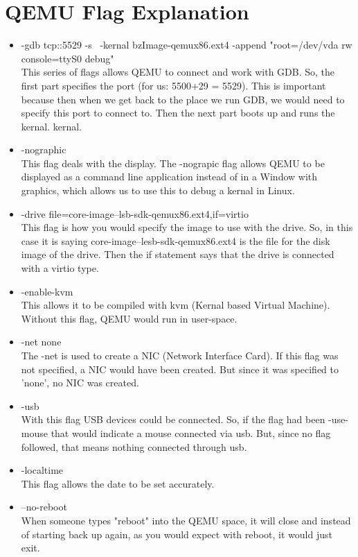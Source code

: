 \documentclass[10pt, onecolumn, letterpaper, draftclsnofoot]{IEEEtran}
\begin{document}
\section{QEMU Flag Explanation}
\begin{itemize}
\item{-gdb tcp::5529 -s \ -kernal bzImage-qemux86.ext4 \--append "root=/dev/vda rw console=ttyS0 debug"} \\
This series of flags allows QEMU to connect and work with GDB. So, the first part 
specifies the port (for us: 5500+29 = 5529). This is important because then when we
get back to the place we run GDB, we would need to specify this port to connect to. 
Then the next part boots up and runs the kernal.
kernal. 
\item{-nographic} \\
This flag deals with the display. The -nograpic flag allows QEMU to be displayed as
a command line application instead of in a Window with graphics, which allows us to 
use this to debug a kernal in Linux. 
\item{-drive file=core-image--lsb-sdk-qemux86.ext4,if=virtio} \\
This flag is how you would specify the image to use with the drive. So, in this case
it is saying core-image--lesb-sdk-qemux86.ext4 is the file for the disk image of the 
drive. Then the if statement says that the drive is connected with a virtio type.
\item{-enable-kvm} \\
This allows it to be compiled with kvm (Kernal based Virtual Machine). Without this
flag, QEMU would run in user-space. 
\item{-net none} \\
The -net is used to create a NIC (Network Interface Card). If this flag was not 
specified, a NIC would have been created. But since it was specified to 'none', no NIC
was created.
\item{-usb} \\
With this flag USB devices could be connected. So, if the flag had been -use-mouse
that would indicate a mouse connected via usb. But, since no flag followed, that means
nothing connected through usb. 
\item{-localtime} \\
This flag allows the date to be set accurately.
\item{--no-reboot} \\ 
When someone types "reboot" into the QEMU space, it will close and instead of starting
back up again, as you would expect with reboot, it would just exit.
\end{itemize}
\end{document}
